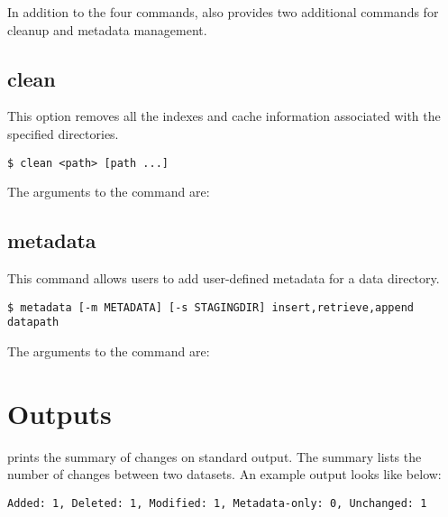 In addition to the four commands, \systemname also provides
two additional commands for cleanup and metadata management.

\subsection{clean}
This option removes all the indexes and cache information
associated with the specified directories.

\texttt{\$ \appcmd clean <path> [path ...]}

The arguments to the command are:


\subsection{metadata}
This command allows users to add user-defined metadata for a data directory. 

\texttt{\$ \appcmd metadata [-m METADATA] [-s STAGINGDIR] {insert,retrieve,append} datapath}

The arguments to the command are:


\section{Outputs}

\systemname prints the summary of changes on standard output. The summary
lists the number of changes between two datasets. An example output looks like below:

\begin{lstlisting}
Added: 1, Deleted: 1, Modified: 1, Metadata-only: 0, Unchanged: 1
\end{lstlisting}

